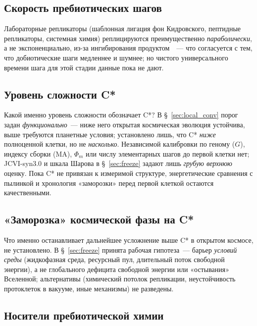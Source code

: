 \documentclass[12pt,a4paper]{article}
\begin{document}
\subsection{Скорость пребиотических шагов}
\label{sec:open_prebiotic_tempo}

Лабораторные репликаторы (шаблонная лигация фон Кидровского, пептидные репликаторы, системная химия) реплицируются преимущественно \emph{параболически}, а не экспоненциально, из-за ингибирования продуктом~\cite{Adamski2020}~--- что согласуется с тем, что добиотические шаги медленнее и шумнее; но чистого универсального времени шага для этой стадии данные пока не дают.

\subsection{Уровень сложности C*}
\label{sec:open_cstar_level}

Какой именно уровень сложности обозначает C*? В \S~\ref{sec:local_conv} порог задан \emph{функционально}~--- ниже него открытая космическая эволюция устойчива, выше требуются планетные условия; установлено лишь, что C* \emph{ниже} полноценной клетки, но не \emph{насколько}. Независимой калибровки по геному ($G$), индексу сборки (MA), $\Phi_m$ или числу элементарных шагов до первой клетки нет; JCVI-syn3.0 и шкала Шарова в \S~\ref{sec:freeze} задают лишь \emph{грубую верхнюю} оценку. Пока C* не привязан к измеримой структуре, энергетические сравнения с пылинкой и хронология «заморозки» перед первой клеткой остаются качественными.

\subsection{«Заморозка» космической фазы на C*}
\label{sec:open_freeze}

Что именно останавливает дальнейшее усложнение выше C* в открытом космосе, не установлено. В \S~\ref{sec:freeze} принята рабочая гипотеза~--- барьер \emph{условий среды} (жидкофазная среда, ресурсный пул, длительный поток свободной энергии), а не глобального дефицита свободной энергии или «остывания» Вселенной; альтернативы (химический потолок репликации, неустойчивость протоклеток в вакууме, иные механизмы) не разведены.

\subsection{Носители пребиотической химии}
\label{sec:open_carriers}
\end{document}
